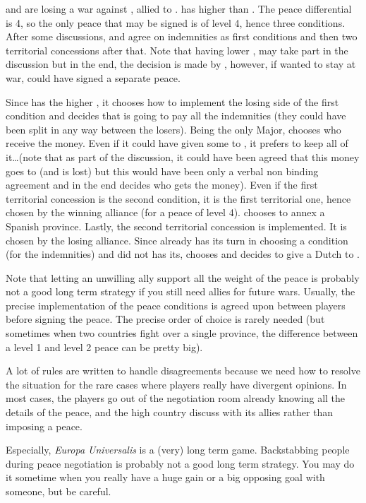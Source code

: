 \begin{exemple}[Disagreement]
  \HIS and \HOL are losing a war against \FRA, allied to \paysPortugal. \HOL
  has higher \DIP than \HIS. The peace differential is 4, so the only peace
  that may be signed is of level 4, hence three conditions. After some
  discussions, \FRA and \HOL agree on indemnities as first conditions and then
  two territorial concessions after that. Note that having lower \DIP, \HIS
  may take part in the discussion but in the end, the decision is made by
  \HOL, however, if \HOL wanted to stay at war, \HIS could have signed a
  separate peace.

  Since \HOL has the higher \DIP, it chooses how to implement the losing side
  of the first condition and decides that \HIS is going to pay all the
  indemnities (they could have been split in any way between the
  losers). Being the only Major, \FRA chooses who receive the money. Even if
  it could have given some to \paysPortugal, it prefers to keep all of
  it\ldots (note that as part of the discussion, it could have been agreed
  that this money goes to \paysPortugal (and is lost) but this would have been
  only a verbal non binding agreement and in the end \FRA decides who gets the
  money). Even if the first territorial concession is the second condition, it
  is the first territorial one, hence chosen by the winning alliance (for a
  peace of level 4). \FRA chooses to annex a Spanish province. Lastly, the
  second territorial concession is implemented. It is chosen by the losing
  alliance. Since \HOL already has its turn in choosing a condition (for the
  indemnities) and \HIS did not has its, \HIS chooses and decides to give a
  Dutch \COL to \paysPortugal.
\end{exemple}

\begin{playtip}
  Note that letting an unwilling ally support all the weight of the peace is
  probably not a good long term strategy if you still need allies for future
  wars. Usually, the precise implementation of the peace conditions is agreed
  upon between players before signing the peace. The precise order of choice
  is rarely needed (but sometimes when two countries fight over a single
  province, the difference between a level 1 and level 2 peace can be pretty
  big).

  \smallskip

  A lot of rules are written to handle disagreements because we need how to
  resolve the situation for the rare cases where players really have divergent
  opinions. In most cases, the players go out of the negotiation room already
  knowing all the details of the peace, and the high \DIP country discuss with
  its allies rather than imposing a peace.

  Especially, \emph{Europa Universalis} is a (very) long term
  game. Backstabbing people during peace negotiation is probably not a good
  long term strategy. You may do it sometime when you really have a huge gain
  or a big opposing goal with someone, but be careful.
\end{playtip}

